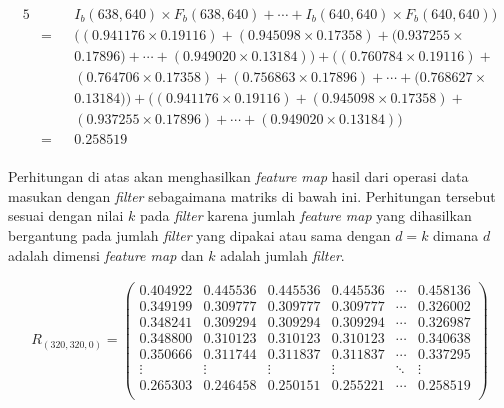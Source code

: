 \begin{alignat*}{5}
        & &&I_{b}(638, 640)\times F_{b}(638, 640) + \cdots + I_{b}(640, 640)\times F_{b}(640, 640) \bigr) \\
        &= &&\bigl( (0.941176\times 0.19116) + (0.945098\times 0.17358) + (0.937255\times \\
        & &&0.17896) + \cdots + (0.949020\times 0.13184) \bigr) + \bigl( (0.760784\times 0.19116) + \\
        & &&(0.764706\times 0.17358) + (0.756863\times 0.17896) + \cdots + (0.768627\times \\
        & &&0.13184) \bigr) + \bigl( (0.941176\times 0.19116) + (0.945098\times 0.17358) + \\
        & &&(0.937255\times 0.17896) + \cdots + (0.949020\times 0.13184) \bigr) \\
        &= &&0.258519 \\
    \end{alignat*}

    Perhitungan di atas akan menghasilkan \textit{feature map} hasil dari operasi data masukan dengan \textit{filter} sebagaimana matriks di bawah ini. Perhitungan tersebut sesuai dengan nilai $k$ pada \textit{filter} karena jumlah \textit{feature map} yang dihasilkan bergantung pada jumlah \textit{filter} yang dipakai atau sama dengan $d=k$ dimana $d$ adalah dimensi \textit{feature map} dan $k$ adalah jumlah \textit{filter}.

    \begin{align*}
        R_{(320, 320, 0)} = 
        \begin{pmatrix}
            0.404922 & 0.445536 & 0.445536 & 0.445536 & \cdots & 0.458136 \\
            0.349199 & 0.309777 & 0.309777 & 0.309777 & \cdots & 0.326002 \\
            0.348241 & 0.309294 & 0.309294 & 0.309294 & \cdots & 0.326987 \\
            0.348800 & 0.310123 & 0.310123 & 0.310123 & \cdots & 0.340638 \\
            0.350666 & 0.311744 & 0.311837 & 0.311837 & \cdots & 0.337295 \\
            \vdots   & \vdots   & \vdots   & \vdots & \ddots &\vdots \\
            0.265303 & 0.246458 & 0.250151 & 0.255221 & \cdots & 0.258519 \\
        \end{pmatrix}
    \end{align*}


